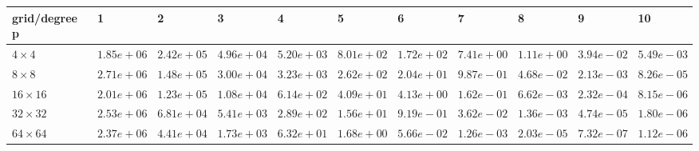 \begin{tabular}{lllllllllll}
\hline
 grid/degree p   & 1          & 2          & 3          & 4          & 5          & 6          & 7          & 8          & 9          & 10         \\
\hline
 $4 \times 4$    & $1.85e+06$ & $2.42e+05$ & $4.96e+04$ & $5.20e+03$ & $8.01e+02$ & $1.72e+02$ & $7.41e+00$ & $1.11e+00$ & $3.94e-02$ & $5.49e-03$ \\
 $8 \times 8$    & $2.71e+06$ & $1.48e+05$ & $3.00e+04$ & $3.23e+03$ & $2.62e+02$ & $2.04e+01$ & $9.87e-01$ & $4.68e-02$ & $2.13e-03$ & $8.26e-05$ \\
 $16 \times 16$  & $2.01e+06$ & $1.23e+05$ & $1.08e+04$ & $6.14e+02$ & $4.09e+01$ & $4.13e+00$ & $1.62e-01$ & $6.62e-03$ & $2.32e-04$ & $8.15e-06$ \\
 $32 \times 32$  & $2.53e+06$ & $6.81e+04$ & $5.41e+03$ & $2.89e+02$ & $1.56e+01$ & $9.19e-01$ & $3.62e-02$ & $1.36e-03$ & $4.74e-05$ & $1.80e-06$ \\
 $64 \times 64$  & $2.37e+06$ & $4.41e+04$ & $1.73e+03$ & $6.32e+01$ & $1.68e+00$ & $5.66e-02$ & $1.26e-03$ & $2.03e-05$ & $7.32e-07$ & $1.12e-06$ \\
\hline
\end{tabular}